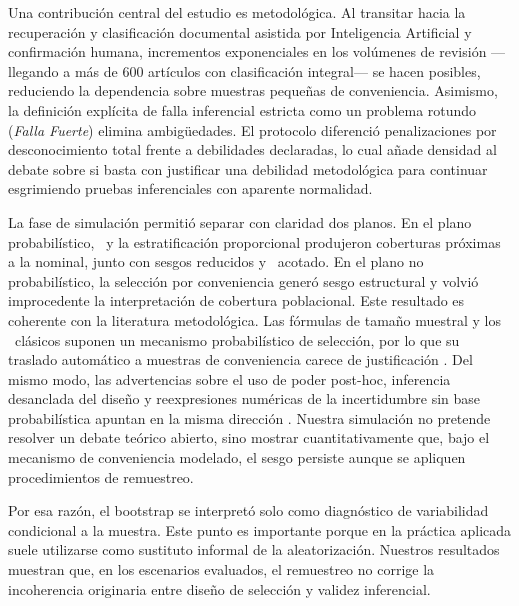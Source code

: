 Una contribución central del estudio es metodológica. Al transitar hacia la recuperación y clasificación documental asistida por Inteligencia Artificial y confirmación humana, incrementos exponenciales en los volúmenes de revisión ---llegando a más de 600 artículos con clasificación integral--- se hacen posibles, reduciendo la dependencia sobre muestras pequeñas de conveniencia. Asimismo, la definición explícita de falla inferencial estricta como un problema rotundo (\textit{Falla Fuerte}) elimina ambigüedades. El protocolo diferenció penalizaciones por desconocimiento total frente a debilidades declaradas, lo cual añade densidad al debate sobre si basta con justificar una debilidad metodológica para continuar esgrimiendo pruebas inferenciales con aparente normalidad.

La fase de simulación permitió separar con claridad dos planos. En el plano probabilístico, \SRS\ y la estratificación proporcional produjeron coberturas próximas a la nominal, junto con sesgos reducidos y \RMSE\ acotado. En el plano no probabilístico, la selección por conveniencia generó sesgo estructural y volvió improcedente la interpretación de cobertura poblacional. Este resultado es coherente con la literatura metodológica. Las fórmulas de tamaño muestral y los \IC\ clásicos suponen un mecanismo probabilístico de selección, por lo que su traslado automático a muestras de conveniencia carece de justificación \citep{noordzij2010}. Del mismo modo, las advertencias sobre el uso de poder post-hoc, inferencia desanclada del diseño y reexpresiones numéricas de la incertidumbre sin base probabilística apuntan en la misma dirección \citep{hoenig2001,thomas1997,reinhart2015,navarrete2019}. Nuestra simulación no pretende resolver un debate teórico abierto, sino mostrar cuantitativamente que, bajo el mecanismo de conveniencia modelado, el sesgo persiste aunque se apliquen procedimientos de remuestreo.

Por esa razón, el bootstrap se interpretó solo como diagnóstico de variabilidad condicional a la muestra. Este punto es importante porque en la práctica aplicada suele utilizarse como sustituto informal de la aleatorización. Nuestros resultados muestran que, en los escenarios evaluados, el remuestreo no corrige la incoherencia originaria entre diseño de selección y validez inferencial.

